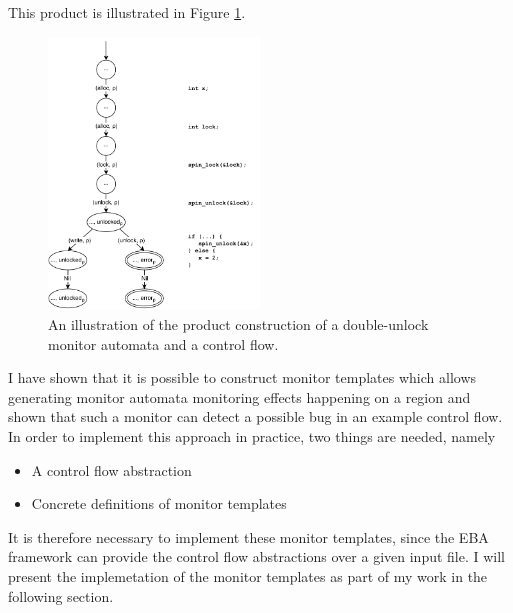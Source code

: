 \noindent This product is illustrated in Figure \ref{cfg_unlock-product}. 

\begin{figure}[H]
    \centering
    \includegraphics[width=0.5\textwidth]{background/figures/cfg_unlock-product}
    \caption{An illustration of the product construction of a double-unlock monitor automata and a control flow.}
    \label{cfg_unlock-product}
\end{figure}

\newpar I have shown that it is possible to construct monitor templates which allows generating monitor automata monitoring effects happening on a region and shown that such a monitor can detect a possible bug in an example control flow. In order to implement this approach in practice, two things are needed, namely

\begin{itemize}
    \item A control flow abstraction
    \item Concrete definitions of monitor templates
\end{itemize}

\noindent It is therefore necessary to implement these monitor templates, since the EBA framework can provide the control flow abstractions over a given input file. I will present the implemetation of the monitor templates as part of my work in the following section. 